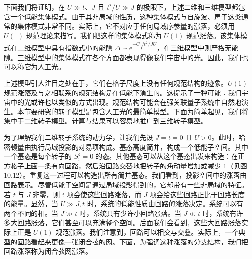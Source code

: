 
下面我们将证明，在 $U\gg t$、$J$ 且 $t^{2}/U\gg J$ 的极限下，上述二维和三维模型都包含一个低能集体模式。由于其非局域的性质，这种集体模式与自旋波、声子这类通常的集体模式非常不同。实际上，它不对应于任何局域序参量的涨落，必须用 $U(1)$ 规范理论来描写。我们把这样的集体模式称为 $U(1)$ 规范涨落。该集体模式在二维模型中具有指数式小的能隙 $\Delta\sim\mathrm{e}^{-C\sqrt{t^{2}/JU}}$，在三维模型中则严格无能隙。三维模型中的集体模式在各个方面都表现得像我们宇宙中的光。因此，我们也可以称它为人工光。

上述模型引人注目之处在于，它们在格子尺度上没有任何规范结构的迹象。$U(1)$ 规范涨落及与之相联系的规范结构是在低能下演生的。这提示了一种可能：我们宇宙中的光或许也以类似的方式出现。规范结构可能会在强关联量子系统中自然地演生。本节要研究的转子模型是包含人工光的最简单模型。下面为简单起见，我们将集中于二维转子模型。计算与结果可以容易地推广到三维转子模型。

为了理解我们二维转子系统的动力学，让我们先设 $J=t=0$ 且 $U>0$。此时，哈密顿量由执行局域投影的对易项构成。基态高度简并，构成一个低能子空间。其中一个基态是每个转子的 $S^{z}_{\pmb i}=0$ 的态。其他基态可以从这个基态出发来构造：在正方格子上画一条有向回路，然后沿回路交替地把转子的角动量增加或减少 1（见图 10.12）。重复这一过程可以构造出所有简并基态。我们看到，投影空间中的涨落由回路表示。尽管低能子空间是通过局域投影得到的，它却带有一些非局域的特征。若 $t$ 与 $J$ 非零，则 $t$ 项会使这些回路涨落，而 $J$ 项会给这些回路正比于回路长度的能量。显然，当 $U\gg J,t$ 时，系统的低能性质由回路的涨落决定。系统可以有两个不同的相。当 $J\gg t$ 时，系统只有少许小回路涨落。当 $J\ll t$ 时，系统有许多大回路涨落，它们甚至可以充满整个空间。后面我们会看到，这些大回路涨落实际上正是 $U(1)$ 规范涨落。我们注意到，回路可以相交与交叠。实际上，一个典型的回路看起来更像一张闭合弦的网。下面，为强调这种涨落的分支结构，我们把回路涨落称为闭合弦网涨落。

